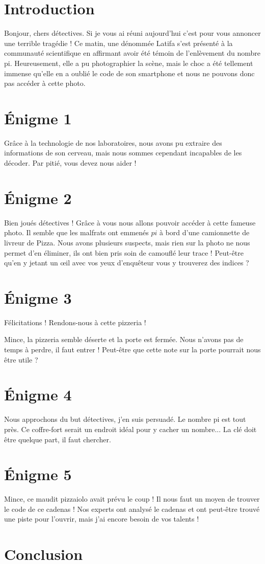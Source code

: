 \documentclass[parskip=half-]{scrartcl}
\begin{document}
\section*{Introduction}
Bonjour, chers détectives. Si je vous ai réuni aujourd'hui c'est pour vous annoncer une terrible tragédie ! Ce matin, une dénommée Latifa s'est présenté à la communauté scientifique en affirmant avoir été témoin de l'enlèvement du nombre pi. Heureusement, elle a pu photographier la scène, mais le choc a été tellement immense qu'elle en a oublié le code de son smartphone et nous ne pouvons donc pas accéder à cette photo.

\section*{Énigme 1}
Grâce à la technologie de nos laboratoires, nous avons pu extraire des informations de son cerveau, mais nous sommes cependant incapables de les décoder. Par pitié, vous devez nous aider !

\section*{Énigme 2}
Bien joués détectives ! Grâce à vous nous allons pouvoir accéder à cette fameuse photo. Il semble que les malfrats ont emmenés $pi$ à bord d'une camionnette de livreur de Pizza. Nous avons plusieurs suspects, mais rien sur la photo ne nous permet d'en éliminer, ils ont bien pris soin de camouflé leur trace ! Peut-être qu'en y jetant un \oe il avec vos yeux d'enquêteur vous y trouverez des indices ?

\section*{Énigme 3}
Félicitations ! Rendons-nous à cette pizzeria !

Mince, la pizzeria semble déserte et la porte est fermée. Nous n'avons pas de temps à perdre, il faut entrer ! Peut-être que cette note sur la porte pourrait nous être utile ? 

\section*{Énigme 4}
Nous approchons du but détectives, j'en suis persuadé. Le nombre pi est tout près. Ce coffre-fort serait un endroit idéal pour y cacher un nombre... La clé doit être quelque part, il faut chercher.

\section*{Énigme 5}
Mince, ce maudit pizzaiolo avait prévu le coup ! Il nous faut un moyen de trouver le code de ce cadenas ! Nos experts ont analysé le cadenas et ont peut-être trouvé une piste pour l'ouvrir, mais j'ai encore besoin de vos talents ! 

\section*{Conclusion}
\end{document}
